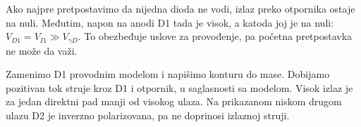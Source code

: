 Ako najpre pretpostavimo da nijedna dioda ne vodi, izlaz preko otpornika ostaje na nuli. Međutim, napon na anodi D1 tada je visok, a katoda joj je na nuli: $V_{D1}=V_{I1}\gg V_{\gamma D}$. To obezbeđuje uslove za provođenje, pa početna pretpostavka ne može da važi.

Zamenimo D1 provodnim modelom i napišimo konturu do mase. Dobijamo pozitivan tok struje kroz D1 i otpornik, u saglasnosti sa modelom. Visok izlaz je za jedan direktni pad manji od visokog ulaza. Na prikazanom niskom drugom ulazu D2 je inverzno polarizovana, pa ne doprinosi izlaznoj struji.
